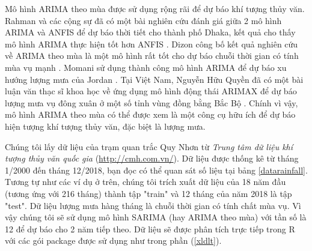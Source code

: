 \documentclass[12pt, a4paper,oneside]{book}
\theoremstyle{definition}
\begin{document}
Mô hình ARIMA theo mùa được sử dụng rộng rãi để dự báo khí tượng thủy văn. Rahman và các cộng sự đã có một bài nghiên cứu đánh giá giữa 2 mô hình ARIMA và ANFIS để dự báo thời tiết cho thành phố Dhaka, kết quả cho thấy mô hình ARIMA thực hiện tốt hơn ANFIS \cite{18}. Dizon công bố kết quả nghiên cứu về ARIMA theo mùa là một mô hình rất tốt cho dự báo chuỗi thời gian có tính mùa vụ mạnh \cite{19}. Momani sử dụng thành công mô hình ARIMA để dự báo xu hướng lượng mưa của Jordan \cite{20}. Tại Việt Nam, Nguyễn Hữu Quyền đã có một bài luận văn thạc sĩ khoa học về ứng dụng mô hình động thái ARIMAX để dự báo lượng mưa vụ đông xuân ở một số tỉnh vùng đồng bằng Bắc Bộ \cite{21}. Chính vì vậy, mô hình ARIMA theo mùa có thể được xem là một công cụ hữu ích để dự báo hiện tượng khí tượng thủy văn, đặc biệt là lượng mưa.

Chúng tôi lấy dữ liệu của trạm quan trắc Quy Nhơn từ \textit{Trung tâm dữ liệu khí tượng thủy văn quốc gia} (\url{http://cmh.com.vn/}). Dữ liệu được thống kê từ tháng 1/2000 đến tháng 12/2018,  bạn đọc có thể quan sát số liệu tại bảng \ref{datarainfall}. Tương tự như các ví dụ ở trên, chúng tôi trích xuất dữ liệu của 18 năm đầu (tương ứng với 216 tháng) thành tập "train" và 12 tháng của năm 2018 là tập "test". Dữ liệu lượng mưa hàng tháng là chuỗi thời gian có tính chất mùa vụ. Vì vậy chúng tôi sẽ sử dụng mô hình SARIMA (hay ARIMA theo mùa) với tần số là 12 để dự báo cho 2 năm tiếp theo. Dữ liệu sẽ được phân tích trực tiếp trong R với các gói package được sử dụng như trong phần (\ref{xldlt}).
\end{document}
